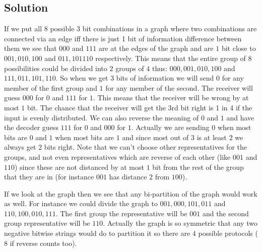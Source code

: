 \documentclass{article}
\begin{document}
\subsection{Solution}
If we put all $8$ possible $3$ bit combinations in a graph where two combinations are connected via an edge iff there is just 1 bit of information difference between them we see that $000$ and $111$ are at the edges of the graph and are $1$ bit close to $001, 010, 100$ and $011, 101 110$ respectively. This means that the entire group of $8$ possibilities could be divided into $2$ groups of $4$ thus: $000, 001, 010, 100$ and $111, 011, 101, 110$. So when we get $3$ bits of information we will send $0$ for any member of the first group and $1$ for any member of the second. The receiver will guess $000$ for $0$ and $111$ for $1$. This means that the receiver will be wrong by at most $1$ bit. The chance that the receiver will get the 3rd bit right is 1 in 4 if the input is evenly distributed. We can also reverse the meaning of $0$ and $1$ and have the decoder guess $111$ for $0$ and $000$ for $1$. Actually we are sending $0$ when most bits are $0$ and $1$ when most bits are $1$ and since most out of $3$ is at least $2$ we always get $2$ bits right. Note that we can't choose other representatives for the groups, and not even representatives which are reverse of each other (like $001$ and $110$) since these are not distanced by at most $1$ bit from the rest of the group that they are in (for instance $001$ has distance $2$ from $100$).

\begin{center}
\end{center}

If we look at the graph then we see that any bi-partition of the graph would work as well. For instance we could divide the graph to $001, 000, 101, 011$ and $110, 100, 010, 111$. The first group the representative will be $001$ and the second group representative will be $110$. Actually the graph is so symmetric that any two negative bitwise strings would do to partition it so there are $4$ possible protocols ($8$ if reverse counts too).

\label{end}
\end{document}
